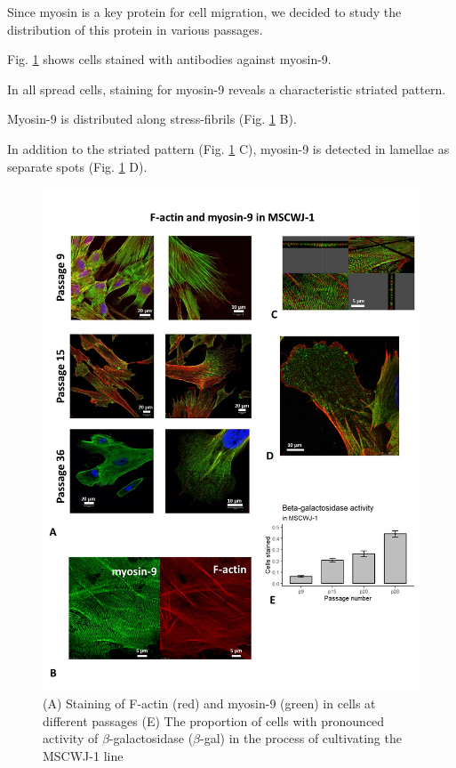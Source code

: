 \documentclass[english,authoryear]{elsarticle}
\begin{document}
Since myosin is a key protein for cell migration, we decided to study the distribution of this protein in various passages.

Fig. \ref{m9-actin-bgal} shows cells stained with antibodies against myosin-9.

In all spread cells, staining for myosin-9 reveals a characteristic striated pattern.

Myosin-9 is distributed along stress-fibrils (Fig. \ref{m9-actin-bgal} B).

In addition to the striated pattern (Fig. \ref{m9-actin-bgal} C), myosin-9 is detected in lamellae as separate spots (Fig. \ref{m9-actin-bgal} D).


\begin{figure}[hbt!]
  \label{m9-actin-bgal}
\centering
\includegraphics[width=0.9\linewidth]{fig_m9-actin-bgal.jpg}
\caption{(A) Staining of F-actin (red) and myosin-9 (green) in cells at different passages (E) The proportion of cells with pronounced activity of $\beta$-galactosidase ($\beta$-gal) in the process of cultivating the MSCWJ-1 line}
\end{figure}
\end{document}
